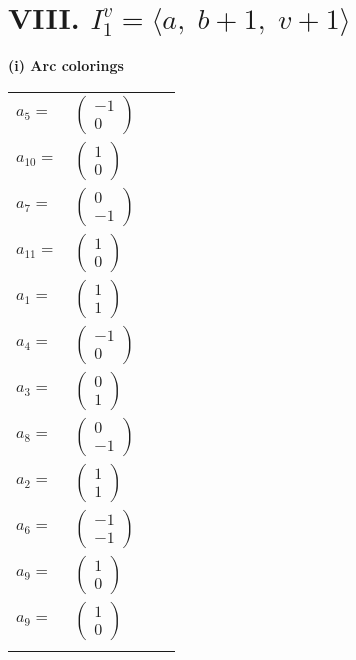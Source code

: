 \documentclass[1p]{elsarticle_modified}
\theoremstyle{definition}
\begin{document}
\centering \section*{VIII. $I^v_{1}= \langle a,\;b+1,\;v+1 \rangle$}
\flushleft \textbf{(i) Arc colorings}\\
\begin{tabular}{m{7pt} m{180pt} m{7pt} m{180pt} }
\flushright $a_{5}=$&$\begin{pmatrix}-1\\0\end{pmatrix}$ \\
\flushright $a_{10}=$&$\begin{pmatrix}1\\0\end{pmatrix}$ \\
\flushright $a_{7}=$&$\begin{pmatrix}0\\-1\end{pmatrix}$ \\
\flushright $a_{11}=$&$\begin{pmatrix}1\\0\end{pmatrix}$ \\
\flushright $a_{1}=$&$\begin{pmatrix}1\\1\end{pmatrix}$ \\
\flushright $a_{4}=$&$\begin{pmatrix}-1\\0\end{pmatrix}$ \\
\flushright $a_{3}=$&$\begin{pmatrix}0\\1\end{pmatrix}$ \\
\flushright $a_{8}=$&$\begin{pmatrix}0\\-1\end{pmatrix}$ \\
\flushright $a_{2}=$&$\begin{pmatrix}1\\1\end{pmatrix}$ \\
\flushright $a_{6}=$&$\begin{pmatrix}-1\\-1\end{pmatrix}$ \\
\flushright $a_{9}=$&$\begin{pmatrix}1\\0\end{pmatrix}$\\ \flushright $a_{9}=$&$\begin{pmatrix}1\\0\end{pmatrix}$\\&\end{tabular}
\end{document}

